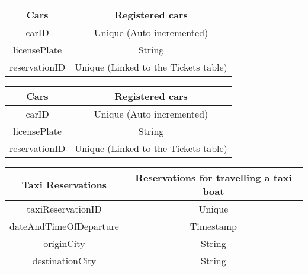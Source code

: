 \begin{table}[H]
\begin{tabular}{|c|c}
\cline{1-1}
Cars & Registered cars \\ \hline
carID & Unique (Auto incremented) \\ licensePlate & String \\ reservationID & Unique (Linked to the Tickets table) \\\hline
\end{tabular}
\end{table}

\begin{table}[H]
\begin{tabular}{|c|c}
\cline{1-1}
Cars & Registered cars \\ \hline
carID & Unique (Auto incremented) \\ licensePlate & String \\ reservationID & Unique (Linked to the Tickets table) \\\hline
\end{tabular}
\end{table}

\begin{table}[H]
\begin{tabular}{|c|c}
\cline{1-1}
Taxi Reservations & Reservations for travelling a taxi boat \\ \hline
taxiReservationID & Unique \\
dateAndTimeOfDeparture & Timestamp \\
originCity & String \\
destinationCity & String \\\hline
\end{tabular}
\end{table}

